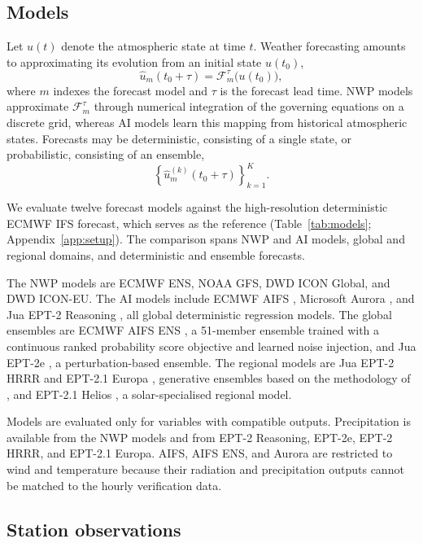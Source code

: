 \documentclass{article}
\begin{document}
\subsection{Models}

Let \(u(t)\) denote the atmospheric state at time \(t\). Weather forecasting
amounts to approximating its evolution from an initial state \(u(t_0)\),
\begin{equation}
\widehat{u}_m(t_0+\tau)
=
\mathcal{F}_m^\tau\bigl(u(t_0)\bigr),
\end{equation}
where \(m\) indexes the forecast model and \(\tau\) is the forecast lead
time. NWP models approximate \(\mathcal{F}_m^\tau\) through numerical
integration of the governing equations on a discrete grid, whereas AI models
learn this mapping from historical atmospheric states. Forecasts may be
deterministic, consisting of a single state, or probabilistic, consisting of
an ensemble,
\[
\left\{\widehat{u}_m^{(k)}(t_0+\tau)\right\}_{k=1}^{K}.
\]

We evaluate twelve forecast models against the high-resolution deterministic
ECMWF IFS forecast, which serves as the reference
(Table~\ref{tab:models}; Appendix~\ref{app:setup}). The comparison spans
NWP and AI models, global and regional domains, and deterministic and
ensemble forecasts.

The NWP models are ECMWF ENS, NOAA GFS, DWD ICON Global, and DWD ICON-EU.
The AI models include ECMWF AIFS \citep{lang2024aifs}, Microsoft Aurora
\citep{bodnar2025aurora}, and Jua EPT-2 Reasoning
\citep{molinaro2025ept2}, all global deterministic regression models. The
global ensembles are ECMWF AIFS ENS \citep{lang2024aifscrps}, a 51-member
ensemble trained with a continuous ranked probability score objective and
learned noise injection, and Jua EPT-2e \citep{molinaro2025ept2}, a
perturbation-based ensemble. The regional models are Jua EPT-2 HRRR
\citep{jua2025hrrr} and EPT-2.1 Europa \citep{jua2026europadocs},
generative ensembles based on the methodology of
\citet{molinaro2026downscaling,molinaro2024gencfd}, and EPT-2.1 Helios
\citep{jua2026helios}, a solar-specialised regional model.

Models are evaluated only for variables with compatible outputs.
Precipitation is available from the NWP models and from EPT-2 Reasoning,
EPT-2e, EPT-2 HRRR, and EPT-2.1 Europa. AIFS, AIFS ENS, and Aurora are
restricted to wind and temperature because their radiation and precipitation
outputs cannot be matched to the hourly verification data.

\subsection{Station observations}
\label{sec:stations}
\end{document}
